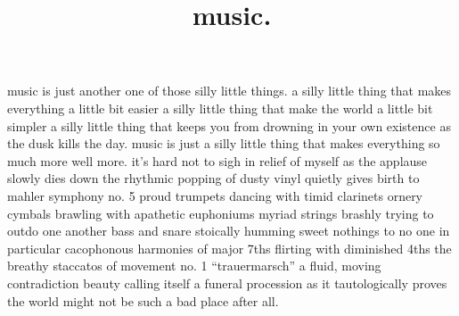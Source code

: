 \documentclass[12pt]{article}
\title{music.}
\begin{document}
\maketitle
\newline
\newline
music is just another one of those silly little things{}.\newline
\newline
\newline
a silly little thing that makes everything a little bit easier\newline
a silly little thing that make the world a little bit simpler\newline
a silly little thing that keeps you from drowning in your own existence\newline
as the dusk kills the day{}.\newline
\newline
\newline
music is just a silly little thing\newline
that makes everything so much more\newline
well\newline
more{}.\newline
\newline
\newline
it’s hard not to sigh in relief of myself as the applause slowly dies down\newline
the rhythmic popping of dusty vinyl quietly gives birth to mahler symphony no. 5\newline
proud trumpets dancing with timid clarinets\newline
ornery cymbals brawling with apathetic euphoniums\newline
myriad strings brashly trying to outdo one another\newline
bass and snare stoically humming sweet nothings to no one in particular\newline
cacophonous harmonies of major 7ths flirting with diminished 4ths\newline
the breathy staccatos of movement no. 1 “trauermarsch”\newline
a fluid, moving contradiction\newline
beauty calling itself a funeral procession\newline
as it tautologically proves\newline
the world might not be such a bad place after all{}.\newline
\newline
\end{document}
